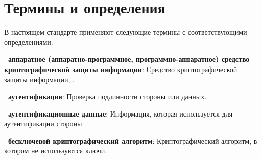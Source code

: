 \chapter{Термины и определения}\label{TERMS}

В настоящем стандарте применяют  
%
%
следующие термины с соответствующими определениями:

{\bf \thedefctr~аппаратное (аппаратно-программное, 
программно-аппаратное) средство криптографической защиты информации}:
Средство криптографической защиты информации, .



{\bf \thedefctr~аутентификация}:
Проверка подлинности стороны или данных.


%
%

{\bf \thedefctr~аутентификационные данные}:
Информация, которая используется для аутентификации стороны.


{\bf \thedefctr~бесключевой криптографический алгоритм}:
Криптографический алгоритм, в котором не используются ключи.


